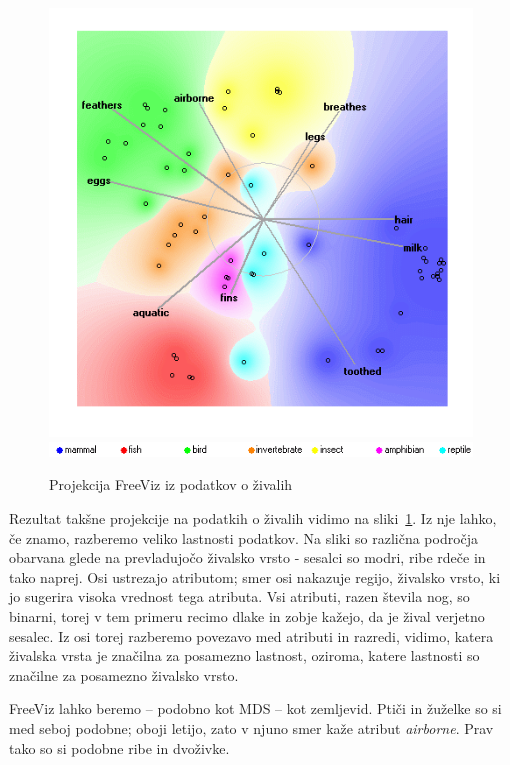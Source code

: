\begin{figure}[tbp]
\begin{center}
\includegraphics[width=12cm]{slike/zoo-freeviz.png}
\includegraphics[width=12cm]{slike/zoo-legenda.png}
\caption{Projekcija FreeViz iz podatkov o živalih}
\label{f-zoo-freeviz}
\end{center}
\end{figure}


Rezultat takšne projekcije na podatkih o živalih vidimo na sliki~\ref{f-zoo-freeviz}. Iz nje lahko, če znamo, razberemo veliko lastnosti podatkov. Na sliki so različna področja obarvana glede na prevladujočo živalsko vrsto - sesalci so modri, ribe rdeče in tako naprej. Osi ustrezajo atributom; smer osi nakazuje regijo, živalsko vrsto, ki jo sugerira visoka vrednost tega atributa. Vsi atributi, razen števila nog, so binarni, torej v tem primeru recimo dlake in zobje kažejo, da je žival verjetno sesalec. Iz osi torej razberemo povezavo med atributi in razredi, vidimo, katera živalska vrsta je značilna za posamezno lastnost, oziroma, katere lastnosti so značilne za posamezno živalsko vrsto.

FreeViz lahko beremo -- podobno kot MDS -- kot zemljevid. Ptiči in žuželke so si med seboj podobne; oboji letijo, zato v njuno smer kaže atribut {\em airborne}. Prav tako so si podobne ribe in dvoživke.

